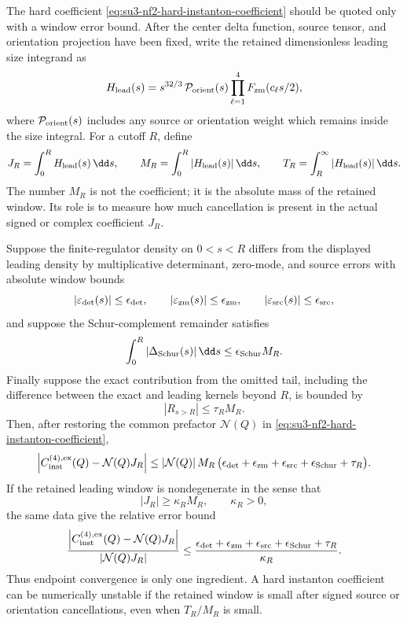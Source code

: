 \begin{controlledapproximation}
\label{ca:hard-instanton-finite-window-bound}
The hard coefficient
\eqref{eq:su3-nf2-hard-instanton-coefficient} should be quoted only with a
window error bound.  After the center delta function, source tensor, and
orientation projection have been fixed, write the retained dimensionless
leading size integrand as
\[
  H_{\rm lead}(s)
  =
  s^{32/3}\,
  \mathcal P_{\rm orient}(s)
  \prod_{\ell=1}^{4}F_{\rm zm}(c_\ell s/2),
\]
where \(\mathcal P_{\rm orient}(s)\) includes any source or orientation
weight which remains inside the size integral.  For a cutoff \(R\), define
\begin{equation}
  J_R=\int_0^R H_{\rm lead}(s)\,\dd s,\qquad
  M_R=\int_0^R |H_{\rm lead}(s)|\,\dd s,\qquad
  T_R=\int_R^\infty |H_{\rm lead}(s)|\,\dd s .
  \label{eq:hard-instanton-window-jmt}
\end{equation}
The number \(M_R\) is not the coefficient; it is the absolute mass of the
retained window.  Its role is to measure how much cancellation is present in
the actual signed or complex coefficient \(J_R\).

Suppose the finite-regulator density on \(0<s<R\) differs from the displayed
leading density by multiplicative determinant, zero-mode, and source errors
with absolute window bounds
\[
  |\varepsilon_{\rm det}(s)|\le\epsilon_{\rm det},\qquad
  |\varepsilon_{\rm zm}(s)|\le\epsilon_{\rm zm},\qquad
  |\varepsilon_{\rm src}(s)|\le\epsilon_{\rm src},
\]
and suppose the Schur-complement remainder satisfies
\[
  \int_0^R|\Delta_{\rm Schur}(s)|\,\dd s
  \le\epsilon_{\rm Schur}M_R .
\]
Finally suppose the exact contribution from the omitted tail, including the
difference between the exact and leading kernels beyond \(R\), is bounded by
\[
  |R_{s>R}|\le \tau_R M_R .
\]
Then, after restoring the common prefactor \(\mathcal N(Q)\) in
\eqref{eq:su3-nf2-hard-instanton-coefficient},
\begin{equation}
  \left|
  C_{\rm inst}^{(4),{\rm ex}}(Q)
  -
  \mathcal N(Q)J_R
  \right|
  \le
  |\mathcal N(Q)|\,M_R\,
  \bigl(
    \epsilon_{\rm det}
    +\epsilon_{\rm zm}
    +\epsilon_{\rm src}
    +\epsilon_{\rm Schur}
    +\tau_R
  \bigr).
  \label{eq:hard-instanton-window-absolute-bound}
\end{equation}
If the retained leading window is nondegenerate in the sense that
\[
  |J_R|\ge \kappa_R M_R,\qquad \kappa_R>0,
\]
the same data give the relative error bound
\begin{equation}
  \frac{
  \left|
  C_{\rm inst}^{(4),{\rm ex}}(Q)
  -
  \mathcal N(Q)J_R
  \right|}
  {|\mathcal N(Q)J_R|}
  \le
  \frac{
    \epsilon_{\rm det}
    +\epsilon_{\rm zm}
    +\epsilon_{\rm src}
    +\epsilon_{\rm Schur}
    +\tau_R}
  {\kappa_R}.
  \label{eq:hard-instanton-window-relative-bound}
\end{equation}
Thus endpoint convergence is only one ingredient.  A hard instanton
coefficient can be numerically unstable if the retained window is small after
signed source or orientation cancellations, even when \(T_R/M_R\) is small.


\end{controlledapproximation}
